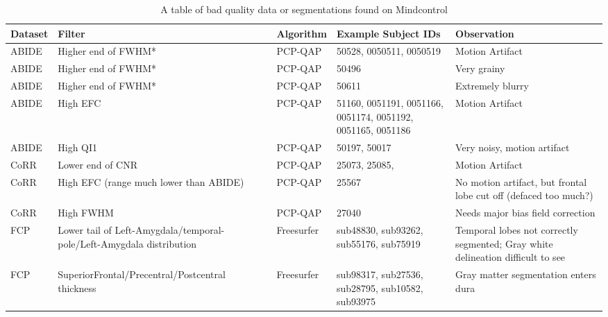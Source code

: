\begin{table}
\begin{tabular}{ | l | p{5cm} | l | p{6cm} | p{6cm} | }

\hline
	\textbf{Dataset} & \textbf{Filter} & \textbf{Algorithm} & \textbf{Example Subject IDs} & \textbf{Observation} \\ \hline
	ABIDE & Higher end of FWHM* & PCP-QAP & 50528, 0050511, 0050519 & Motion Artifact \\ \hline
	ABIDE & Higher end of FWHM* & PCP-QAP & 50496 & Very grainy \\ \hline
	ABIDE & Higher end of FWHM* & PCP-QAP & 50611 & Extremely blurry \\ \hline
	ABIDE & High EFC & PCP-QAP & 51160, 0051191, 0051166, 0051174, 0051192, 0051165, 0051186 & Motion Artifact \\ \hline
	ABIDE & High QI1 & PCP-QAP & 50197, 50017 & Very noisy, motion artifact \\ \hline
	CoRR & Lower end of CNR & PCP-QAP & 25073, 25085, & Motion Artifact \\ \hline
	CoRR & High EFC (range much lower than ABIDE) & PCP-QAP & 25567 & No motion artifact, but frontal lobe cut off (defaced too much?) \\ \hline
	CoRR & High FWHM & PCP-QAP & 27040 & Needs major bias field correction \\ \hline
	FCP & Lower tail of Left-Amygdala/temporal-pole/Left-Amygdala distribution & Freesurfer & sub48830, sub93262, sub55176, sub75919 & Temporal lobes not correctly segmented; Gray white delineation difficult to see \\ \hline
	FCP & SuperiorFrontal/Precentral/Postcentral thickness & Freesurfer & sub98317, sub27536, sub28795, sub10582, sub93975 & Gray matter segmentation enters dura \\ \hline



\end{tabular}
\label{tab:examples}
\caption{A table of bad quality data or segmentations found on Mindcontrol}

\end{table}
